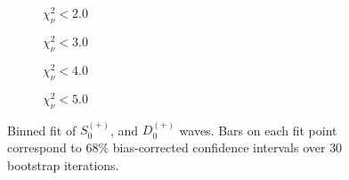\begin{figure}[htbp]
    \centering
    \begin{subfigure}{0.45\textwidth}
        
        \caption{$\chi^2_\nu < 2.0$}
    \end{subfigure}
    \hfill
    \begin{subfigure}{0.45\textwidth}
        
        \caption{$\chi^2_\nu < 3.0$}
    \end{subfigure}
    \vspace{1em}
    \begin{subfigure}{0.45\textwidth}
        
        \caption{$\chi^2_\nu < 4.0$}
    \end{subfigure}
    \hfill
    \begin{subfigure}{0.45\textwidth}
        
        \caption{$\chi^2_\nu < 5.0$}
    \end{subfigure}

    \caption{Binned fit of $S_{0}^{(+)}$, and $D_{0}^{(+)}$ waves. Bars on each fit point correspond to $68\%$ bias-corrected confidence intervals over $ 30 $ bootstrap iterations.}
    \label{fig:binned-fit-all-Sp-D0p}
\end{figure}

